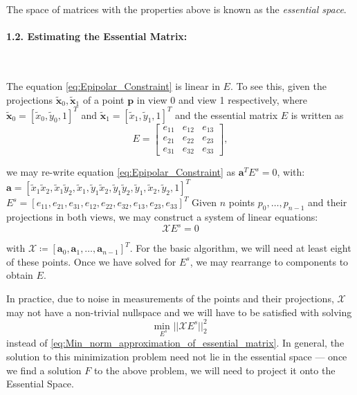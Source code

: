 The space of matrices with the properties above is known as the \textit{essential space}.
 
 \paragraph{1.2. Estimating the Essential Matrix:}\ 
 
 The equation \eqref{eq:Epipolar_Constraint} is linear in $E$. To see this, given the projections $\mathbf{\tilde{x}}_{0}, \mathbf{\tilde{x}}_{1}$ of a point $\mathbf{p}$ in view 0 and view 1 respectively, where
 $\mathbf{\tilde{x}}_{0} = [\tilde{x}_0, \tilde{y}_0, 1]^T$ and $\mathbf{\tilde{x}}_{1} = [\tilde{x}_1, \tilde{y}_1, 1]^T$ and the essential matrix $E$ is written as 
 \begin{equation}
 E = 
     \begin{bmatrix}
     e_{11} & e_{12} & e_{13} \\
     e_{21} & e_{22} & e_{23} \\
     e_{31} & e_{32} & e_{33} 
     \end{bmatrix},
 \end{equation}
 
 we may re-write equation \eqref{eq:Epipolar_Constraint} as 
 $\mathbf{a}^{T}E^{s} = 0 $, with:
 \newline
 $\mathbf{a} = [\tilde{x}_{1}\tilde{x}_{2}, \tilde{x}_{1}\tilde{y}_{2}, \tilde{x}_{1}, \tilde{y}_{1}\tilde{x}_{2}, \tilde{y}_{1}\tilde{y}_{2}, \tilde{y}_{1}, \tilde{x}_{2}, \tilde{y}_{2}, 1]^T$
 \newline 
 $E^{s} = [e_{11},e_{21},e_{31},e_{12},e_{22},e_{32},e_{13},e_{23},e_{33}]^{T}$
 \newline
 \newline
 Given $n$ points $p_0, \hdots, p_{n-1}$ and their projections in both views, we may construct a system of linear equations:
 \begin{equation}\label{eq:Min_norm_approximation_of_essential_matrix}
   \mathcal{X}E^{s} = 0  
 \end{equation}
 
 with $\mathcal{X} \coloneqq [\mathbf{a}_{0},\mathbf{a}_{1},\hdots, \mathbf{a}_{n-1}]^{T}$. For the basic algorithm, we will need at least eight of these points. Once we have solved for $E^{s}$, we may rearrange to components to obtain $E$.
 
 In practice, due to noise in measurements of the points and their projections, $\mathcal{X}$ may not have a non-trivial nullspace and we will have to be satisfied with solving
 \begin{equation}\label{eq:Min_norm_approximation_of_essential_matrix2}
    \underset{E^{s}}{\text{min }} ||\mathcal{X}E^{s}||^{2}_2
 \end{equation}
 instead of \eqref{eq:Min_norm_approximation_of_essential_matrix}.
 In general, the solution to this minimization problem need not lie in the essential space --- once we find a solution $F$ to the above problem, we will need to project it onto the Essential Space.
 

